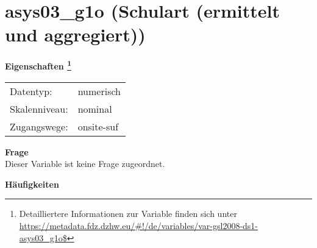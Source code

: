 
    \setcounter{footnote}{0}

    \vspace*{-1.8cm}
	\section{asys03\_g1o (Schulart (ermittelt und aggregiert))}
	\label{section:asys03_g1o}



    \vspace*{0.5cm}
    \noindent\textbf{Eigenschaften
	\footnote{Detailliertere Informationen zur Variable finden sich unter
		\url{https://metadata.fdz.dzhw.eu/\#!/de/variables/var-gsl2008-ds1-asys03_g1o$}}}\\
	\begin{tabularx}{\hsize}{@{}lX}
	Datentyp: & numerisch \\
	Skalenniveau: & nominal \\
	Zugangswege: &
	  onsite-suf
 \\
    \end{tabularx}



		\vspace*{0.5cm}
		\noindent\textbf{Frage}\\
		Dieser Variable ist keine Frage zugeordnet.





        		\vspace*{0.5cm}
                \noindent\textbf{Häufigkeiten}

